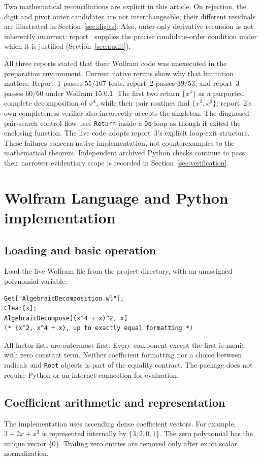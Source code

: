 \documentclass[11pt,a4paper]{article}
\numberwithin{equation}{section}
\theoremstyle{definition}
\theoremstyle{remark}
\newcommand{\code}[1]{\texttt{#1}}
\begin{document}
Two mathematical reconciliations are explicit in this article.  On rejection,
the digit and pivot outer candidates are not interchangeable; their different
residuals are illustrated in Section~\ref{sec:digits}.  Also, outer-only
derivative recursion is not inherently incorrect: report~\cite{r1} supplies
the precise candidate-order condition under which it is justified
(Section~\ref{sec:audit}).

All three reports stated that their Wolfram code was unexecuted in the
preparation environment.  Current native reruns show why that limitation
matters.  Report~1 passes \(55/107\) tests, report~2 passes \(39/53\), and
report~3 passes \(60/60\) under Wolfram 15.0.1.  The first two return
\(\{x^4\}\) as a purported complete decomposition of \(x^4\), while their
pair routines find \(\{x^2,x^2\}\); report~2's own completeness verifier also
incorrectly accepts the singleton.  The diagnosed pair-search control flow
uses \code{Return} inside a \code{Do} loop as though it exited the enclosing
function.  The live code adopts report~3's explicit loop-exit structure.
These failures concern native implementation, not counterexamples to the
mathematical theorem.  Independent archived Python checks continue to pass;
their narrower evidentiary scope is recorded in Section~\ref{sec:verification}.

\section{Wolfram Language and Python implementation}
\label{sec:implementation}

\subsection{Loading and basic operation}
Load the live Wolfram file from the project directory, with an unassigned
polynomial variable:
\begin{lstlisting}
Get["AlgebraicDecomposition.wl"];
Clear[x];
AlgebraicDecompose[(x^4 + x)^2, x]
(* {x^2, x^4 + x}, up to exactly equal formatting *)
\end{lstlisting}
All factor lists are outermost first.  Every component except the first is
monic with zero constant term.  Neither coefficient formatting nor a choice
between radicals and \code{Root} objects is part of the equality contract.
The package does not require Python or an internet connection for evaluation.

\subsection{Coefficient arithmetic and representation}
The implementation uses ascending dense coefficient vectors. For example,
$3+2x+x^3$ is represented internally by $\{3,2,0,1\}$. The zero polynomial
has the unique vector $\{0\}$. Trailing zero entries are removed only after
exact scalar normalization.
\end{document}
